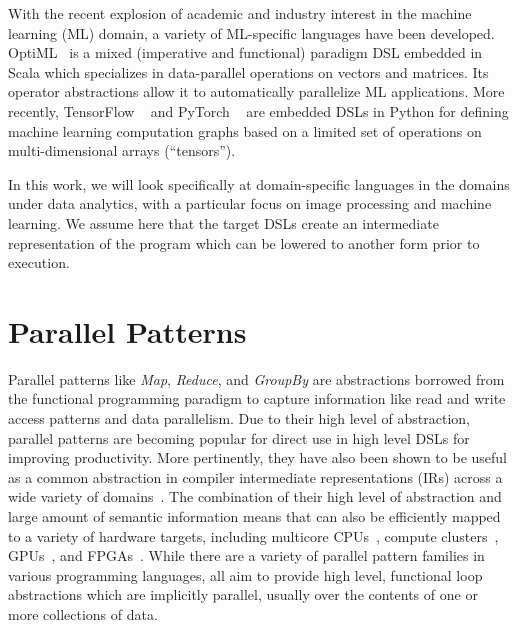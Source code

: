 With the recent explosion of academic and industry interest in the machine learning (ML) domain,
a variety of ML-specific languages have been developed.
OptiML~\cite{optiml} is a mixed (imperative and functional) paradigm DSL embedded in Scala
which specializes in data-parallel operations on vectors and matrices.
Its operator abstractions allow it to automatically parallelize ML applications.
More recently, TensorFlow ~\cite{tensorflow} and PyTorch ~\cite{pytorch} are
embedded DSLs in Python for defining machine learning computation graphs based on
a limited set of operations on multi-dimensional arrays (``tensors'').

In this work, we will look specifically at domain-specific languages in the domains under
data analytics, with a particular focus on image processing and machine learning.
We assume here that the target DSLs create an intermediate representation of the program
which can be lowered to another form prior to execution.


\section{Parallel Patterns}
\label{parallel-patterns}

Parallel patterns like \emph{Map}, \emph{Reduce}, and \emph{GroupBy} are abstractions
borrowed from the functional programming paradigm
to capture information like read and write access patterns and data parallelism.
Due to their high level of abstraction, parallel patterns are becoming
popular for direct use in high level DSLs for improving productivity.
More pertinently, they have also been shown to be useful as a common abstraction in compiler
intermediate representations (IRs) across a wide variety of domains~\cite{ecoop13sujeeth,pldi13halide}.
The combination of their high level of abstraction and
large amount of semantic information
means that can also be efficiently mapped to a variety of hardware
targets, including multicore CPUs~\cite{scala,haskell,delite-tecs14},
compute clusters~\cite{mapreduce,zaharia10spark,spartan},
GPUs~\cite{catanzaro11copperhead,micro14lee},
and FPGAs~\cite{auerbach10lime,george14fpl}.
While there are a variety of parallel pattern families in various programming
languages, all aim to provide high level, functional loop abstractions which
are implicitly parallel, usually over the contents of one or more
collections of data.



